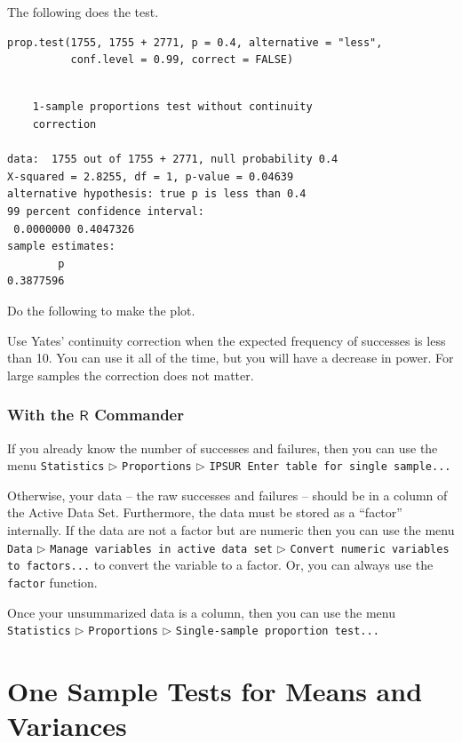 \documentclass[captions=tableheading]{scrbook}
\begin{document}
The following does the test.


\begin{verbatim}
prop.test(1755, 1755 + 2771, p = 0.4, alternative = "less", 
          conf.level = 0.99, correct = FALSE)
\end{verbatim}


\begin{verbatim}

	1-sample proportions test without continuity
	correction

data:  1755 out of 1755 + 2771, null probability 0.4 
X-squared = 2.8255, df = 1, p-value = 0.04639
alternative hypothesis: true p is less than 0.4 
99 percent confidence interval:
 0.0000000 0.4047326 
sample estimates:
        p 
0.3877596
\end{verbatim}

Do the following to make the plot.


Use Yates' continuity correction when the expected frequency of successes is less than 10. You can use it all of the time, but you will have a decrease in power. For large samples the correction does not matter. 
\subsubsection{With the \(\mathsf{R}\) Commander}
\label{sec-10-2-1-2}


If you already know the number of successes and failures, then you can use the menu \texttt{Statistics} \(\triangleright\) \texttt{Proportions} \(\triangleright\) \texttt{IPSUR Enter table for single sample...}

Otherwise, your data -- the raw successes and failures -- should be in a column of the Active Data Set. Furthermore, the data must be stored as a ``factor'' internally. If the data are not a factor but are numeric then you can use the menu \texttt{Data} \(\triangleright\) \texttt{Manage variables in active data set} \(\triangleright\) \texttt{Convert numeric variables to factors...} to convert the variable to a factor. Or, you can always use the \texttt{factor} function.

Once your unsummarized data is a column, then you can use the menu \texttt{Statistics} \(\triangleright\) \texttt{Proportions} \(\triangleright\) \texttt{Single-sample proportion test...}
\section{One Sample Tests for Means and Variances}
\label{sec-10-3}
\label{sec-One-Sample-Tests}
\end{document}
